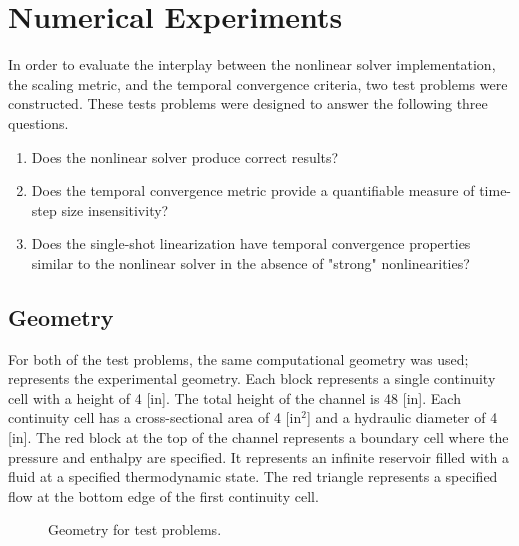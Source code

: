 \section{Numerical Experiments}
\label{sect:numerical_experiments}

In order to evaluate the interplay between the nonlinear solver implementation, the scaling metric, and the temporal convergence criteria, two test problems were constructed.
These tests problems were designed to answer the following three questions.

\begin{enumerate}
\item{Does the nonlinear solver produce correct results?}
\item{Does the temporal convergence metric provide a quantifiable measure of time-step size insensitivity?}
\item{Does the single-shot linearization have temporal convergence properties similar to the nonlinear solver in the absence of "strong" nonlinearities?}
\end{enumerate}

\subsection{Geometry}
\label{subsect:experimental_geometry}
For both of the test problems, the same computational geometry was used;   represents the experimental geometry.
Each block represents a single continuity cell with a height of 4 [in].
The total height of the channel is 48 [in].
Each continuity cell has a cross-sectional area of 4 [in$^2$] and a hydraulic diameter of 4 [in].
The red block at the top of the channel represents a boundary cell where the pressure and enthalpy are specified.
It represents an infinite reservoir filled with a fluid at a specified thermodynamic state.
The red triangle represents a specified flow at the bottom edge of the first continuity cell. 

\begin{figure}[h!t]
\label{fig:exp_geometry}
\begin{center}
\end{center}
\caption{Geometry for test problems.}
\end{figure}

